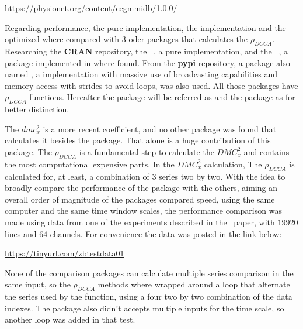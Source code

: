 \documentclass[article]{jss}
\begin{document}
\begin{center}
	\url{https://physionet.org/content/eegmmidb/1.0.0/}
\end{center}


Regarding performance, the pure  implementation, the  implementation and the optimized  where compared with 3 oder packages that calculates the $\rho_{DCCA}$. Researching the  \textbf{CRAN} repository, the ~\citep{R-DFA}, a pure  implementation, and  the ~\citep{R-DCCA},  a  package implemented in  where found. From the  \textbf{pypi} repository, a package also named \citep{alchieri2024lateralization}, a  implementation with massive use of  broadcasting capabilities and memory access with strides to avoid loops, was also used. All those packages have $\rho_{DCCA}$ functions. Hereafter the   package will be referred as  and the   package as  for better distinction.

The $dmc_{x}^{2}$ is a more recent coefficient, and no other package was found that calculates it besides the  package. That alone is a huge contribution of this package. The $\rho_{DCCA}$ is a fundamental step to calculate the $DMC_{x}^{2}$ and contains the most computational expensive parts. In the $DMC_{x}^{2}$ calculation, The $\rho_{DCCA}$ is calculated for, at least, a combination of 3 series two by two. With the idea to broadly compare the performance of the  package with the others, aiming an overall order of magnitude of the packages compared speed, using the same computer and the same time window scales, the performance comparison was made using data from one of the experiments described in the~\cite{schalk2004bci2000} paper, with $19920$ lines and $64$ channels. For convenience the data was posted in the link below:

\begin{center}
  	\url{https://tinyurl.com/zbtestdata01}
\end{center}

None of the comparison packages can calculate multiple series comparison in the same input, so the $\rho_{DCCA}$ methods where wrapped around a loop that alternate the series used by the function, using a four two by two combination of the data indexes. The  package also didn't accepts multiple inputs for the time scale, so another loop was added in that test. 
\end{document}
